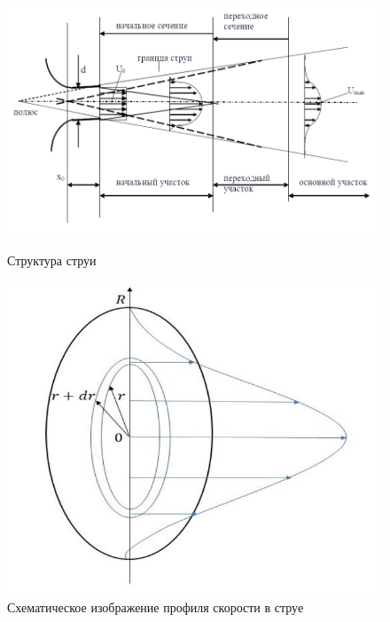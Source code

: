             \begin{figure}[h]
                \centering
                \begin{minipage}{0.6\textwidth}
                    \centering
                    \includegraphics[width=0.9\linewidth]{images/structure.png}
                    \caption{Структура струи}
                    \label{fig:structure}
                \end{minipage}\hfill
                \begin{minipage}{0.4\textwidth}
                    \centering
                    \includegraphics[width=0.9\linewidth]{images/profile.png}
                    \caption{Схематическое изображение профиля скорости в струе}
                    \label{fig:profile}
                \end{minipage}
            \end{figure}

            \newpage

